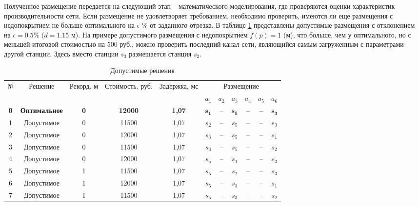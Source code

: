 Полученное размещение передается на следующий этап – математического моделирования, где проверяются оценки характеристик производительности сети. Если размещение не удовлетворяет требованием, необходимо проверить, имеются ли еще размещения с недопокрытием не больше оптимального на $\epsilon$ $\%$ от заданного отрезка. В таблице \cref{tab:part4_bnb_feasible_result} представлены допустимые размещения с отклонением на $\epsilon = 0.5 \% $ ($d = 1.15$ м). На примере допустимого размещения  с недопокрытием $f(p) = 1 $ (м), что больше, чем у оптимального, но с меньшей итоговой стоимостью на 500 руб., можно проверить последний канал сети, являющийся самым загруженным с параметрами другой станции. Здесь вместо станции $s_3$ размещается станция $s_2$.



\begin{table}[h!]\centering
  \begin{tabular}{| c | c | c | c | c | c  c  c  c  c  c |}
    \hline
    \multirow{2}{0.02\textwidth}{№} & \multirow{2}{0.15\textwidth}{Решение} & \multirow{2}{0.1\textwidth}{Рекорд, м} & \multirow{2}{0.135\textwidth}{Стоимость, руб.} & \multirow{2}{0.13\textwidth}{Задержка, мс} & \multicolumn{6}{|c|}{Размещение} \\\cline{6-11}

    &&&&& $a_1$&	$a_2$&	$a_3$&	$a_4$&	$a_5$&	$a_6$\\
    \hline
    \textbf{0}&	\textbf{Оптимальное}& \textbf{0}&	\textbf{12000}&	\textbf{1,07}& 	$\mathbf{s_1}$&	--&	$\mathbf{s_5}$& 	\textbf{--}& \textbf{--}&	$\mathbf{s_3}$ \\
    \hline
    1&	Допустимое& 0&	11500&	1,07& 	$s_2$&	--&	$s_5$& 	--& --&	$s_3$ \\
    2&	Допустимое& 0&	12000&	1,07& 	$s_3$&	--&	$s_5$& 	--& --&	$s_1$ \\
    3&	Допустимое& 0&	11500&	1,07& 	$s_3$&	--&	$s_5$& 	--& --&	$s_2$ \\
    4&	Допустимое& 0&	12000&	1,07& 	$s_5$&	--&	$s_1$& 	--& --&	$s_3$ \\
    5&	Допустимое& 1&	11500&	1,07& 	$s_5$&	--&	$s_2$& 	--& --&	$s_3$ \\
    6&	Допустимое& 1&	12000&	1,07& 	$s_5$&	--&	$s_3$& 	--& --&	$s_1$ \\
    7&	Допустимое& 1& 11500&	1,07& 	$s_5$&	--&	$s_3$& 	--& --&	$s_2$ \\
    \hline 
    
  \end{tabular}\caption{Допустимые решения}\label{tab:part4_bnb_feasible_result}
\end{table}
\normalsize

